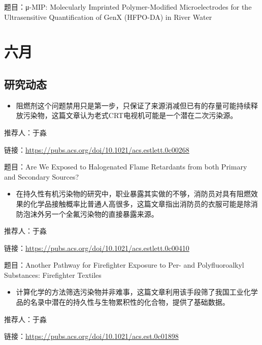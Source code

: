 \documentclass[
]{book}
\providecommand{\tightlist}{%
  \setlength{\itemsep}{0pt}\setlength{\parskip}{0pt}}
\begin{document}
题目：μ-MIP: Molecularly Imprinted Polymer-Modified Microelectrodes for the Ultrasensitive Quantification of GenX (HFPO-DA) in River Water

\hypertarget{ux516dux6708-2}{%
\section*{六月}\label{ux516dux6708-2}}

\hypertarget{ux7814ux7a76ux52a8ux6001-31}{%
\subsection*{研究动态}\label{ux7814ux7a76ux52a8ux6001-31}}

\begin{itemize}
\tightlist
\item
  阻燃剂这个问题禁用只是第一步，只保证了来源消减但已有的存量可能持续释放污染物，这篇文章认为老式CRT电视机可能是一个潜在二次污染源。
\end{itemize}

推荐人：于淼

链接：\url{https://pubs.acs.org/doi/10.1021/acs.estlett.0c00268}

题目：Are We Exposed to Halogenated Flame Retardants from both Primary and Secondary Sources?

\begin{itemize}
\tightlist
\item
  在持久性有机污染物的研究中，职业暴露其实做的不够，消防员对具有阻燃效果的化学品接触概率比普通人高很多，这篇文章指出消防员的衣服可能是除消防泡沫外另一个全氟污染物的直接暴露来源。
\end{itemize}

推荐人：于淼

链接：\url{https://pubs.acs.org/doi/10.1021/acs.estlett.0c00410}

题目：Another Pathway for Firefighter Exposure to Per- and Polyfluoroalkyl Substances: Firefighter Textiles

\begin{itemize}
\tightlist
\item
  计算化学的方法筛选污染物并非难事，这篇文章利用该手段筛了我国工业化学品的名录中潜在的持久性与生物累积性的化合物，提供了基础数据。
\end{itemize}

推荐人：于淼

链接：\url{https://pubs.acs.org/doi/10.1021/acs.est.0c01898}
\end{document}
